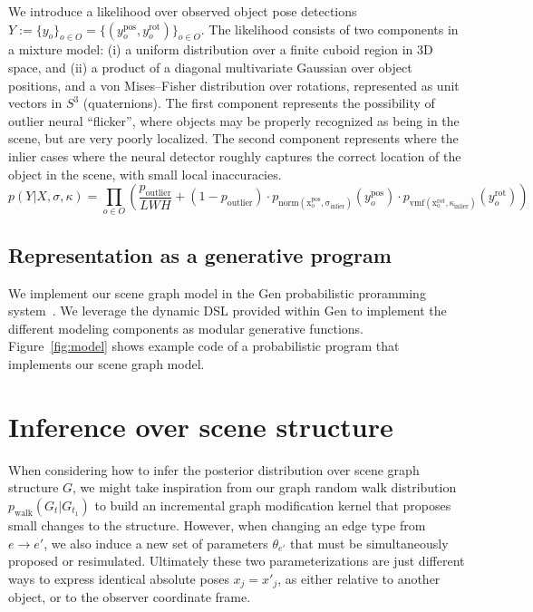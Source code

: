 We introduce a likelihood over observed object pose detections $Y := \{y_o\}_{o \in O} = \{(y_o^\mathrm{pos}, y_o^\mathrm{rot})\}_{o \in O}$.
The likelihood consists of two components in a mixture model:
(i) a uniform distribution over a finite cuboid region in 3D space, and
(ii) a product of a diagonal multivariate Gaussian over object positions, and a von Mises--Fisher distribution over rotations, represented as unit vectors in $S^3$ (quaternions).
The first component represents the possibility of outlier neural ``flicker'', where objects may be properly recognized as being in the scene, but are very poorly localized.
The second component represents where the inlier cases where the neural detector roughly captures the correct location of the object in the scene, with small local inaccuracies.
\begin{equation} \label{eq:noisy-pose-likelihood}
  p(Y | X, \sigma, \kappa) =
  \prod_{o \in O}
    \left(\frac{p_\mathrm{outlier}}{LWH} +
    (1 - p_\mathrm{outlier}) \cdot p_\mathrm{norm(x_o^\mathrm{pos}, \sigma_\mathrm{inlier})}\left(y_o^\mathrm{pos}\right) \cdot
    p_\mathrm{vmf(x_o^\mathrm{rot}, \kappa_\mathrm{inlier})}(y_o^\mathrm{rot})\right)
\end{equation}

\subsection{Representation as a generative program}
We implement our scene graph model in the Gen probabilistic proramming system~\cite{Cusumano-Towner:2019:GGP:3314221.3314642}.
We leverage the dynamic DSL provided within Gen to implement the different modeling components as modular generative functions.
Figure~\ref{fig:model} shows example code of a probabilistic program that implements our scene graph model.


\section{Inference over scene structure} \label{section:rjmcmc}
When considering how to infer the posterior distribution over scene graph structure $G$, we might take inspiration from our graph random walk distribution $p_\mathrm{walk}(G_t|G_{t_1})$ to build an incremental graph modification kernel that proposes small changes to the structure.
However, when changing an edge type from $e \to e'$, we also induce a new set of parameters $\theta_{e'}$ that must be simultaneously proposed or resimulated.
Ultimately these two parameterizations are just different ways to express identical absolute poses $x_j = x'_j$, as either relative to another object, or to the observer coordinate frame.


